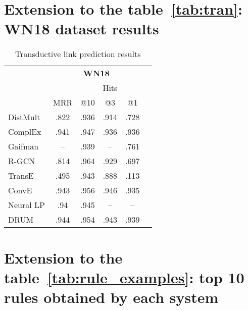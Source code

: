 \documentclass{article}
\begin{document}
\clearpage

\section{Extension to the table~\ref{tab:tran}: WN18 dataset results}
\begin{table}[!h]
    \centering  
    \caption{Transductive link prediction results}
    \label{tab:tran_appendix}
    \begin{tabular}{lccccc}
        \toprule
         & \multicolumn{4}{c}{\textbf{WN18}} 
        \\
        \cmidrule{2-5} 
         & & \multicolumn{3}{c}{Hits}
        \\
        \cmidrule{3-5} 
         & MRR & @10 & @3 & @1 
        \\
        \midrule
        DistMult  & .822 & .936 & .914 & .728 
        \\
        ComplEx  & .941 & .947 & .936 & .936 
        \\
        Gaifman  & --    & .939 &  --   & .761   
        \\
        R-GCN  & .814 & .964 & .929 & .697 
        \\
        TransE & .495 & .943 & .888 & .113 
        \\
ConvE  & .943 & .956 & .946 &.935 \\
        \midrule
        
        Neural LP  & .94 & .945 & -- & -- 
        \\
        DRUM & .944 & .954 & .943 & .939  \\ 
        \bottomrule
    \end{tabular}
\end{table}

\section{Extension to the table~\ref{tab:rule_examples}: top 10 rules obtained by each system}
\end{document}

